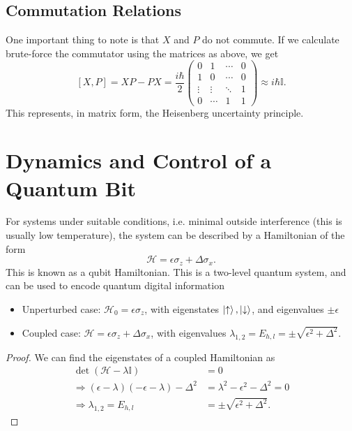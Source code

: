 \documentclass{article}
\begin{document}
\subsection{Commutation Relations}
One important thing to note is that $X$ and $P$ do not commute. If we calculate brute-force the commutator using the matrices as above, we get
\[
    \left[ X,P \right]=XP-PX=\frac{i \hbar}{2}\begin{pmatrix}
        0 & 1 & \cdots & 0\\
        1 & 0 & \cdots & 0\\
        \vdots & \vdots & \ddots & 1 \\
        0 & \cdots & 1 & 1
    \end{pmatrix}\approx i \hbar \mathbb{I}.
\]
This represents, in matrix form, the Heisenberg uncertainty principle.

\section{Dynamics and Control of a Quantum Bit}
For systems under suitable conditions, i.e. minimal outside interference (this is usually low temperature), the system can be described by a Hamiltonian of the form
\[
    \mathcal{H}=\epsilon \sigma _z+\Delta \sigma _x.
\]
This is known as a qubit Hamiltonian. This is a two-level quantum system, and can be used to encode quantum digital information
\begin{itemize}
    \item Unperturbed case: $\mathcal{H}_0=\epsilon \sigma _z$, with eigenstates $\ket{\uparrow},\ket{\downarrow}$, and eigenvalues $\pm\epsilon $
    \item Coupled case: $\mathcal{H}=\epsilon \sigma _z+\Delta \sigma _x$, with eigenvalues $\lambda _{1,2}=E_{h,l}=\pm\sqrt{\epsilon^2+\Delta^2}$.
\end{itemize}

\begin{proof}
    We can find the eigenstates of a coupled Hamiltonian as
    \begin{align*}
        \det(\mathcal{H}-\lambda \mathbb{I}) &= 0 \\
        \Rightarrow (\epsilon -\lambda )(-\epsilon -\lambda )-\Delta ^2&=\lambda^2-\epsilon^2-\Delta^2 =0\\
        \Rightarrow \lambda _{1,2}=E_{h,l}&=\pm\sqrt{\epsilon^2+\Delta^2}.
    \end{align*}
\end{proof}
\end{document}
